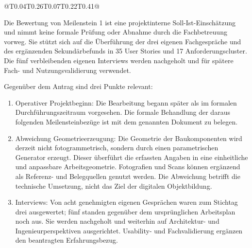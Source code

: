 \documentclass[type=zwischenbericht,theme=dark]{zukunftbau}
\begin{document}
\begin{Table}[title=Meilensteine gemäß Zuwendungsbescheid\, Ziffer 8.3]
\begin{SemioTable}{@{}T{0.04\tabcolsep}T{0.26\tabcolsep}T{0.07\tabcolsep}T{0.22\tabcolsep}T{0.41\tabcolsep}@{}}
\end{SemioTable}
\end{Table}

Die Bewertung von Meilenstein 1 ist eine projektinterne Soll-Ist-Einschätzung und nimmt keine formale Prüfung oder Abnahme durch die Fachbetreuung vorweg. Sie stützt sich auf die Überführung der drei eigenen Fachgespräche und des ergänzenden Sekundärbefunds in 35 User Stories und 17 Anforderungscluster. Die fünf verbleibenden eigenen Interviews werden nachgeholt und für spätere Fach- und Nutzungsvalidierung verwendet.

Gegenüber dem Antrag sind drei Punkte relevant:

\begin{enumerate}
\item Operativer Projektbeginn: Die Bearbeitung begann später als im formalen Durchführungszeitraum vorgesehen. Die formale Behandlung der daraus folgenden Meilensteinbezüge ist mit dem genannten Dokument zu belegen.
\item Abweichung Geometrieerzeugung: Die Geometrie der Baukomponenten wird derzeit nicht fotogrammetrisch, sondern durch einen parametrischen Generator erzeugt. Dieser überführt die erfassten Angaben in eine einheitliche und anpassbare Arbeitsgeometrie. Fotografien und Scans können ergänzend als Referenz- und Belegquellen genutzt werden. Die Abweichung betrifft die technische Umsetzung, nicht das Ziel der digitalen Objektbildung.
\item Interviews: Von acht genehmigten eigenen Gesprächen waren zum Stichtag drei ausgewertet; fünf standen gegenüber dem ursprünglichen Arbeitsplan noch aus. Sie werden nachgeholt und weiterhin auf Architektur- und Ingenieurperspektiven ausgerichtet. Usability- und Fachvalidierung ergänzen den beantragten Erfahrungsbezug.
\end{enumerate}
\end{document}
